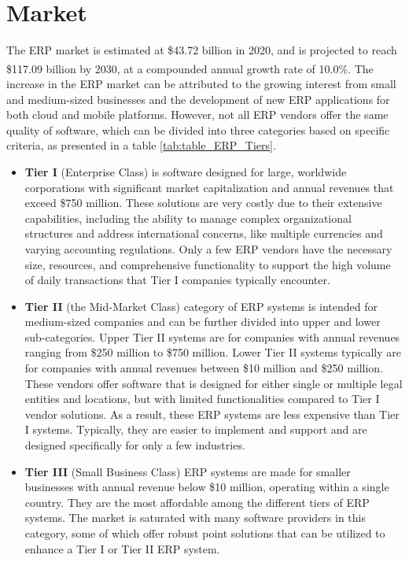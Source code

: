 \section{Market}
The ERP market is estimated at \$43.72 billion in 2020, and is projected to reach \$117.09 billion
by 2030, at a compounded annual growth rate of 10.0\%\textsuperscript{\cite{erp_market}}. The increase in the ERP market can be
attributed to the growing interest from small and medium-sized businesses and the development of new
ERP applications for both cloud and mobile platforms. However, not all ERP vendors offer the same
quality of software, which can be divided into three categories based on specific criteria, as
presented in a table \ref{tab:table_ERP_Tiers}.
\begin{itemize}
    \item \textbf{Tier I} (Enterprise Class) is software designed for large, worldwide corporations with significant market capitalization and annual revenues that exceed \$750 million. These solutions are very costly due to their extensive capabilities, including the ability to manage complex organizational structures and address international concerns, like multiple currencies and varying accounting regulations. Only a few ERP vendors have the necessary size, resources, and comprehensive functionality to support the high volume of daily transactions that Tier I companies typically encounter.
    \item \textbf{Tier II} (the Mid-Market Class) category of ERP systems is intended for medium-sized companies and can be further divided into upper and lower sub-categories. Upper Tier II systems are for companies with annual revenues ranging from \$250 million to \$750 million. Lower Tier II systems typically are for companies with annual revenues between \$10 million and \$250 million.
          These vendors offer software that is designed for either single or multiple legal entities and locations, but with limited functionalities compared to Tier I vendor solutions. As a result, these ERP systems are less expensive than Tier I systems. Typically, they are easier to implement and support and are designed specifically for only a few industries.
    \item \textbf{Tier III} (Small Business Class) ERP systems are made for smaller businesses with annual revenue below \$10 million, operating within a single country. They are the most affordable among the different tiers of ERP systems. The market is saturated with many software providers in this category, some of which offer robust point solutions that can be utilized to enhance a Tier I or Tier II ERP system.
\end{itemize}
